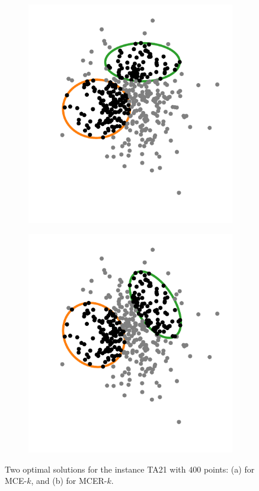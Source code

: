 \begin{figure}
	\begin{subfigure}{.5\textwidth}
		\centering
		\includegraphics[scale=.9]{figures/MCE_TA21}
		\caption{}
		\label{fig:MCE_TA21}
	\end{subfigure}
	\begin{subfigure}{.5\textwidth}
		\centering
		\includegraphics[scale=.9]{figures/MCER_TA21}
		\caption{}
		\label{fig:MCER_TA21}
	\end{subfigure}
	\caption{Two optimal solutions for the instance TA21 with $400$ points: (a) for MCE-$k$, and (b) for MCER-$k$.}
	\label{fig:TA21}
\end{figure}

